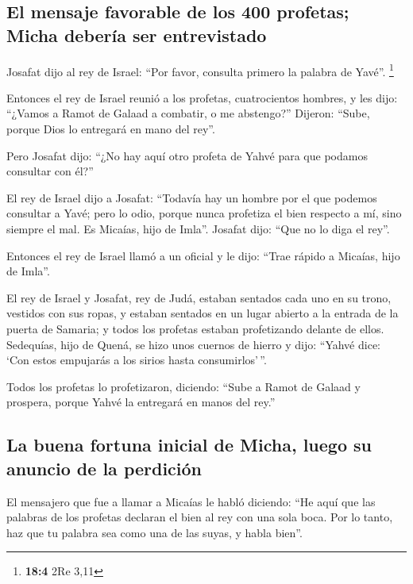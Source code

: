 \begin{paracol}{2}
\hypertarget{el-mensaje-favorable-de-los-400-profetas-micha-deberuxeda-ser-entrevistado}{%
\subsection{El mensaje favorable de los 400 profetas; Micha debería ser
entrevistado}\label{el-mensaje-favorable-de-los-400-profetas-micha-deberuxeda-ser-entrevistado}}

 Josafat dijo al rey de Israel: ``Por favor, consulta
primero la palabra de Yavé''. \footnote{\textbf{18:4} 2Re 3,11}

 Entonces el rey de Israel reunió a los profetas,
cuatrocientos hombres, y les dijo: ``¿Vamos a Ramot de Galaad a
combatir, o me abstengo?'' Dijeron: ``Sube, porque Dios lo entregará en
mano del rey''.

 Pero Josafat dijo: ``¿No hay aquí otro profeta de Yahvé
para que podamos consultar con él?''

 El rey de Israel dijo a Josafat: ``Todavía hay un hombre
por el que podemos consultar a Yavé; pero lo odio, porque nunca
profetiza el bien respecto a mí, sino siempre el mal. Es Micaías, hijo
de Imla''. Josafat dijo: ``Que no lo diga el rey''.

 Entonces el rey de Israel llamó a un oficial y le dijo:
``Trae rápido a Micaías, hijo de Imla''.

 El rey de Israel y Josafat, rey de Judá, estaban sentados
cada uno en su trono, vestidos con sus ropas, y estaban sentados en un
lugar abierto a la entrada de la puerta de Samaria; y todos los profetas
estaban profetizando delante de ellos.  Sedequías, hijo
de Quená, se hizo unos cuernos de hierro y dijo: ``Yahvé dice: `Con
estos empujarás a los sirios hasta consumirlos'\,''.

 Todos los profetas lo profetizaron, diciendo: ``Sube a
Ramot de Galaad y prospera, porque Yahvé la entregará en manos del
rey.''

\hypertarget{la-buena-fortuna-inicial-de-micha-luego-su-anuncio-de-la-perdiciuxf3n}{%
\subsection{La buena fortuna inicial de Micha, luego su anuncio de la
perdición}\label{la-buena-fortuna-inicial-de-micha-luego-su-anuncio-de-la-perdiciuxf3n}}

 El mensajero que fue a llamar a Micaías le habló
diciendo: ``He aquí que las palabras de los profetas declaran el bien al
rey con una sola boca. Por lo tanto, haz que tu palabra sea como una de
las suyas, y habla bien''.


\end{paracol}
